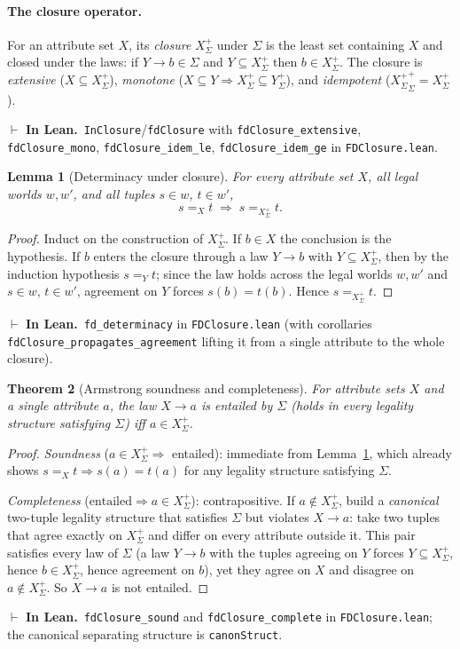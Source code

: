 \documentclass[11pt]{article}
\newcommand{\clo}[1]{{#1}^{+}_{\Sigma}}      %
\newcommand{\lean}[1]{\texttt{#1}}           %
\theoremstyle{plain}
\newtheorem{theorem}{Theorem}
\newtheorem{lemma}[theorem]{Lemma}
\theoremstyle{definition}
\newcommand{\inlean}[1]{\par\smallskip\noindent%
  {\small\textcolor{blue!50!black}{$\vdash$ \textbf{In Lean.}}~#1}\par\smallskip}
\begin{document}
\paragraph{The closure operator.}
For an attribute set $X$, its \emph{closure} $\clo X$ under $\Sigma$ is the least set
containing $X$ and closed under the laws: if $Y\to b\in\Sigma$ and $Y\subseteq\clo X$ then
$b\in\clo X$. The closure is \emph{extensive} ($X\subseteq\clo X$), \emph{monotone}
($X\subseteq Y\Rightarrow\clo X\subseteq\clo Y$), and \emph{idempotent}
($\clo{\clo X}=\clo X$).
\inlean{\lean{InClosure}/\lean{fdClosure} with \lean{fdClosure\_extensive},
\lean{fdClosure\_mono}, \lean{fdClosure\_idem\_le}, \lean{fdClosure\_idem\_ge} in
\lean{FDClosure.lean}.}

\begin{lemma}[Determinacy under closure]\label{lem:fd-det}
For every attribute set $X$, all legal worlds $w,w'$, and all tuples $s\in w$, $t\in w'$,
\[
  s =_X t \;\Longrightarrow\; s =_{\clo X} t.
\]
\end{lemma}
\begin{proof}
Induct on the construction of $\clo X$. If $b\in X$ the conclusion is the hypothesis. If
$b$ enters the closure through a law $Y\to b$ with $Y\subseteq\clo X$, then by the induction
hypothesis $s =_Y t$; since the law holds across the legal worlds $w,w'$ and $s\in w$,
$t\in w'$, agreement on $Y$ forces $s(b)=t(b)$. Hence $s =_{\clo X} t$.
\end{proof}
\inlean{\lean{fd\_determinacy} in \lean{FDClosure.lean} (with corollaries
\lean{fdClosure\_propagates\_agreement} lifting it from a single attribute to the whole
closure).}

\begin{theorem}[Armstrong soundness and completeness]\label{thm:armstrong}
For attribute sets $X$ and a single attribute $a$, the law $X\to a$ is entailed by $\Sigma$
(holds in every legality structure satisfying $\Sigma$) \emph{iff} $a\in\clo X$.
\end{theorem}
\begin{proof}
\emph{Soundness} ($a\in\clo X\Rightarrow$ entailed): immediate from
Lemma~\ref{lem:fd-det}, which already shows $s=_X t \Rightarrow s(a)=t(a)$ for any legality
structure satisfying $\Sigma$.

\emph{Completeness} ($\text{entailed}\Rightarrow a\in\clo X$): contrapositive. If
$a\notin\clo X$, build a \emph{canonical} two-tuple legality structure that satisfies $\Sigma$
but violates $X\to a$: take two tuples that agree exactly on $\clo X$ and differ on every
attribute outside it. This pair satisfies every law of $\Sigma$ (a law $Y\to b$ with the
tuples agreeing on $Y$ forces $Y\subseteq\clo X$, hence $b\in\clo X$, hence agreement on $b$),
yet they agree on $X$ and disagree on $a\notin\clo X$. So $X\to a$ is not entailed.
\end{proof}
\inlean{\lean{fdClosure\_sound} and \lean{fdClosure\_complete} in \lean{FDClosure.lean}; the
canonical separating structure is \lean{canonStruct}.}
\end{document}
